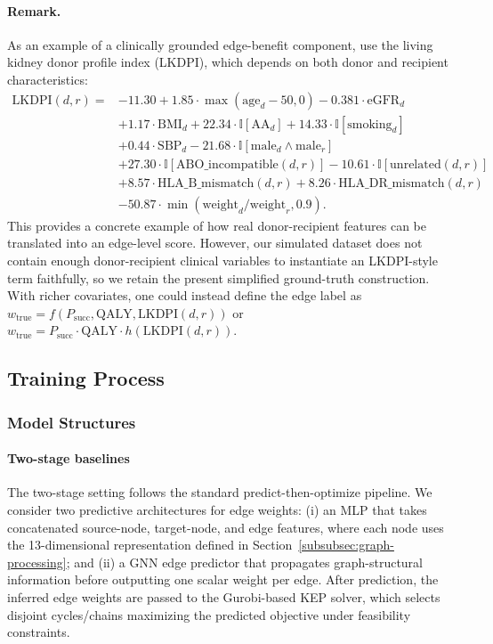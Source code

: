 \documentclass{article}
\begin{document}
\paragraph{Remark.}
As an example of a clinically grounded edge-benefit component, \citet{massie2016risk} use the living kidney donor profile index (LKDPI), which depends on both donor and recipient characteristics:
\begin{align*}
\mathrm{LKDPI}(d,r)={}&-11.30
+ 1.85 \cdot \max(\mathrm{age}_d - 50, 0)
- 0.381 \cdot \mathrm{eGFR}_d \\
&+ 1.17 \cdot \mathrm{BMI}_d
+ 22.34 \cdot \mathbb{I}[\mathrm{AA}_d]
+ 14.33 \cdot \mathbb{I}[\mathrm{smoking}_d] \\
&+ 0.44 \cdot \mathrm{SBP}_d
- 21.68 \cdot \mathbb{I}[\mathrm{male}_d \land \mathrm{male}_r] \\
&+ 27.30 \cdot \mathbb{I}[\mathrm{ABO\_incompatible}(d,r)]
- 10.61 \cdot \mathbb{I}[\mathrm{unrelated}(d,r)] \\
&+ 8.57 \cdot \mathrm{HLA\_B\_mismatch}(d,r)
+ 8.26 \cdot \mathrm{HLA\_DR\_mismatch}(d,r) \\
&- 50.87 \cdot \min(\mathrm{weight}_d/\mathrm{weight}_r, 0.9).
\end{align*}
This provides a concrete example of how real donor-recipient features can be translated into an edge-level score. However, our simulated dataset does not contain enough donor-recipient clinical variables to instantiate an LKDPI-style term faithfully, so we retain the present simplified ground-truth construction. With richer covariates, one could instead define the edge label as \(w_{\text{true}} = f(P_{\mathrm{succ}}, \mathrm{QALY}, \mathrm{LKDPI}(d,r))\) or \(w_{\text{true}} = P_{\mathrm{succ}} \cdot \mathrm{QALY} \cdot h(\mathrm{LKDPI}(d,r))\).

\subsection{Training Process}

\subsubsection{Model Structures}

\paragraph{Two-stage baselines}
The two-stage setting follows the standard predict-then-optimize pipeline. We consider two predictive architectures for edge weights: (i) an MLP that takes concatenated source-node, target-node, and edge features, where each node uses the 13-dimensional representation defined in Section~\ref{subsubsec:graph-processing}; and (ii) a GNN edge predictor that propagates graph-structural information before outputting one scalar weight per edge. After prediction, the inferred edge weights are passed to the Gurobi-based KEP solver, which selects disjoint cycles/chains maximizing the predicted objective under feasibility constraints.
\end{document}

